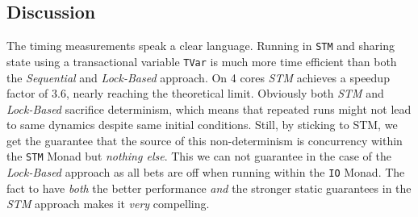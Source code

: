 \subsection{Discussion}
The timing measurements speak a clear language. Running in \texttt{STM} and sharing state using a transactional variable \texttt{TVar} is much more time efficient than both the \textit{Sequential} and \textit{Lock-Based} approach. On 4 cores \textit{STM} achieves a speedup factor of 3.6, nearly reaching the theoretical limit.
Obviously both \textit{STM} and \textit{Lock-Based} sacrifice determinism, which means that repeated runs might not lead to same dynamics despite same initial conditions. Still, by sticking to STM, we get the guarantee that the source of this non-determinism is concurrency within the \texttt{STM} Monad but \textit{nothing else}. This we can not guarantee in the case of the \textit{Lock-Based} approach as all bets are off when running within the \texttt{IO} Monad. The fact to have \textit{both} the better performance \textit{and} the stronger static guarantees in the \textit{STM} approach makes it \textit{very} compelling.